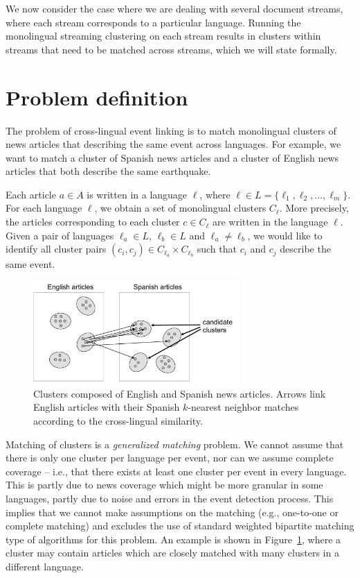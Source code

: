 We now consider the case where we are dealing with several document streams, where each
stream corresponds to a particular language. Running the monolingual streaming clustering
on each stream results in clusters within streams that need to be matched across streams,
which we will state formally.

\section{Problem definition}

The problem of cross-lingual event linking is to match monolingual clusters of news articles 
that describing the same event across languages. For example, we want to match a cluster of 
Spanish news articles and a cluster of English news articles that both describe the same earthquake.

Each article $a \in A$ is written in a language $\ell$, where $\ell \in L = \{\ell_1,\ell_2,...,\ell_m\}$. 
For each language $\ell$, we obtain a set of monolingual clusters $C_{\ell}$. More precisely, 
the articles corresponding to each cluster $c \in C_{\ell}$ are written in the language $\ell$. 
Given a pair of languages $\ell_a \in L$, $\ell_b \in L$ and $\ell_a \not= \ell_b$, we would like 
to identify all cluster pairs $(c_i, c_j) \in C_{\ell_a} \times C_{\ell_b}$ such that $c_i$ and $c_j$ describe the same event.

\begin{figure}[tb]
\centering
\includegraphics[width=0.7\textwidth]{figures/clusters.pdf}
\caption{\label{fig:clusters} Clusters composed of English and Spanish news articles. Arrows link English articles with their Spanish $k$-nearest neighbor matches according to the cross-lingual similarity.}
\end{figure}

Matching of clusters is a \emph{generalized matching} problem. We cannot assume that there is only 
one cluster per language per event, nor can we assume complete coverage -- i.e., that there exists 
at least one cluster per event in every language. This is partly due to news coverage which might 
be more granular in some languages, partly due to noise and errors in the event detection process. This 
implies that we cannot make assumptions on the matching (e.g., one-to-one or complete matching) and excludes 
the use of standard weighted bipartite matching type of algorithms for this problem. An example is shown in 
Figure~\ref{fig:clusters}, where a cluster may contain articles which are closely matched with many clusters in a different language.

